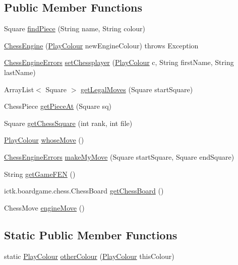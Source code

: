 \subsection*{Public Member Functions}
\begin{DoxyCompactItemize}
\item 
Square \hyperlink{classswantech_1_1_chess_engine_aa9586accdd914705d51e7f2097f57355}{find\+Piece} (String name, String colour)
\item 
\hyperlink{classswantech_1_1_chess_engine_a206b7f60195b050af7bf73124a359bd5}{Chess\+Engine} (\hyperlink{enumswantech_1_1_play_colour}{Play\+Colour} new\+Engine\+Colour)  throws Exception     
\item 
\hyperlink{enumswantech_1_1_chess_engine_errors}{Chess\+Engine\+Errors} \hyperlink{classswantech_1_1_chess_engine_aa5030a1e441c0868999509e35652636c}{set\+Chessplayer} (\hyperlink{enumswantech_1_1_play_colour}{Play\+Colour} c, String first\+Name, String last\+Name)
\item 
Array\+List$<$ Square $>$ \hyperlink{classswantech_1_1_chess_engine_a529858ea407075c6a4daf04d5b3dd51e}{get\+Legal\+Moves} (Square start\+Square)
\item 
Chess\+Piece \hyperlink{classswantech_1_1_chess_engine_ad09f3dd52a728a42cdb1515e7104f03e}{get\+Piece\+At} (Square sq)
\item 
Square \hyperlink{classswantech_1_1_chess_engine_a67cbcb3acff7c6e81281433bfcab6f9d}{get\+Chess\+Square} (int rank, int file)
\item 
\hyperlink{enumswantech_1_1_play_colour}{Play\+Colour} \hyperlink{classswantech_1_1_chess_engine_ae6976be646e833558d31d2e3bf242773}{whose\+Move} ()
\item 
\hyperlink{enumswantech_1_1_chess_engine_errors}{Chess\+Engine\+Errors} \hyperlink{classswantech_1_1_chess_engine_a0e8106f504de2a1cec26d523865c3d02}{make\+My\+Move} (Square start\+Square, Square end\+Square)
\item 
String \hyperlink{classswantech_1_1_chess_engine_a06277d63732bbc472ad1a61e0f5e5ae8}{get\+Game\+F\+E\+N} ()
\item 
ictk.\+boardgame.\+chess.\+Chess\+Board \hyperlink{classswantech_1_1_chess_engine_a5da88bbf80cf6d33938067237b10f44c}{get\+Chess\+Board} ()
\item 
Chess\+Move \hyperlink{classswantech_1_1_chess_engine_a4e2edbbc872baf9bd0f180a132090584}{engine\+Move} ()
\end{DoxyCompactItemize}
\subsection*{Static Public Member Functions}
\begin{DoxyCompactItemize}
\item 
static \hyperlink{enumswantech_1_1_play_colour}{Play\+Colour} \hyperlink{classswantech_1_1_chess_engine_a7648685bcb41ac4cf391c39cbccef90a}{other\+Colour} (\hyperlink{enumswantech_1_1_play_colour}{Play\+Colour} this\+Colour)
\end{DoxyCompactItemize}



